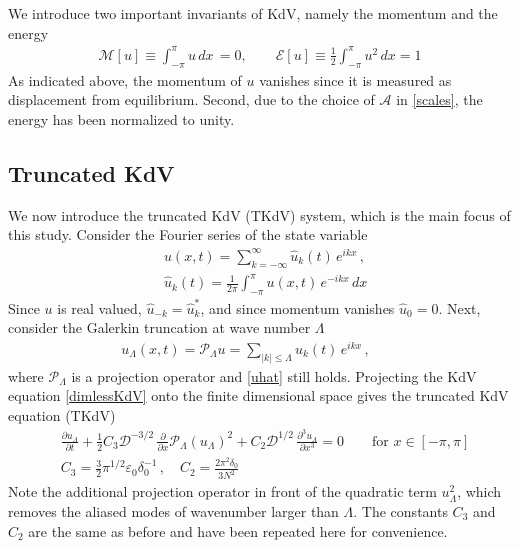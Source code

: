 \documentclass[11pt]{article}
\newcommand{\pd}[2]    { \frac{\partial #1} {\partial #2} }
\newcommand{\abs}[1]{\left| #1 \right|}
\newcommand{\eps}{\varepsilon}
\newcommand{\dx}{\, dx}
\newcommand{\lamfac}{N}
\newcommand{\drat}{\mathcal{D}}
\newcommand{\En}{\mathcal{E}}
\newcommand{\Mo}{\mathcal{M}}
\newcommand{\ampscale}{\mathcal{A}}
\newcommand{\epsup}{\eps_0}
\newcommand{\delup}{\delta_0}
\newcommand{\uhat}{\hat{u}}
\newcommand{\sympJ}{\mathcal{J}}
\newcommand{\vard}[2]{\frac{\delta #1}{\delta #2}}
\newcommand{\Ham}{\mathcal{H}}
\newcommand{\Hup}{\Ham^{-}}
\newcommand{\Hdn}{\Ham^{+}}
\newcommand{\Fcnl}{\mathcal{F}}
\newcommand{\Proj}{\mathcal{P}_{\Lambda}}
\newcommand{\uL}{u_{\Lambda}}
\begin{document}
We introduce two important invariants of KdV, namely the momentum and the energy
\begin{align}
\label{MomEn}
\Mo[u] \equiv \int_{-\pi}^{\pi} u \dx \, = 0 , \qquad
\En[u] \equiv \frac{1}{2} \int_{-\pi}^{\pi} u^2 \dx = 1
\end{align}
As indicated above, the momentum of $u$ vanishes since it is measured as displacement from equilibrium. Second, due to the choice of $\ampscale$ in \eqref{scales}, the energy has been normalized to unity.

\subsection{Truncated KdV}
\label{tKdVSec}

We now introduce the truncated KdV (TKdV) system, which is the main focus of this study. Consider the Fourier series of the state variable
\begin{align}
&u(x,t) = \sum_{k=-\infty}^{\infty} \uhat_k(t) \, e^{i k x} \, , \\
\label{uhat}
&\uhat_k(t) = \frac{1}{2 \pi} \int_{-\pi}^{\pi} u(x,t) \, e^{-i k x} \dx
\end{align}
Since $u$ is real valued, $\uhat_{-k} = \uhat_{k}^*$, and since momentum vanishes $\uhat_0 = 0$.
Next, consider the Galerkin truncation at wave number $\Lambda$
\begin{align}
\uL(x,t) = \Proj u =
\sum_{\abs{k} \le \Lambda} \uhat_k(t) \, e^{i k x} \, , \qquad
\end{align}
where $\Proj$ is a projection operator and \eqref{uhat} still holds. Projecting the KdV equation \eqref{dimlessKdV} onto the finite dimensional space gives the truncated KdV equation (TKdV)
\begin{align}
\label{TKdV}
&\pd{\uL}{t} +  \frac{1}{2} C_3 \drat^{-3/2} \, \pd{}{x} \Proj (\uL)^2 + C_2 \drat^{1/2} \, \frac{\partial^3 \uL}{\partial x^3} = 0
\qquad \text{for } x \in [-\pi,\pi] \\
&C_3 = \frac{3}{2} \pi^{1/2} \epsup \delup^{-1} \, , \quad C_2 = \frac{2 \pi^2 \delup}{3 \lamfac^2}
\end{align}
Note the additional projection operator in front of the quadratic term $\uL^2$, which removes the aliased modes of wavenumber larger than $\Lambda$. The constants $C_3$ and $C_2$ are the same as before and have been repeated here for convenience. 
\end{document}
